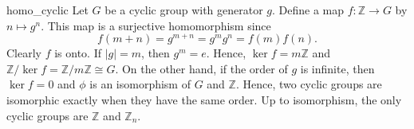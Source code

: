  
\begin{example}{homo_cyclic}
Let $G$ be a cyclic group with generator $g$. Define a map $f :
{\mathbb Z} \rightarrow G$ by $n \mapsto g^n$.  This map is a surjective
homomorphism since  
\[
f( m + n) = g^{m+n} = g^m g^n = f(m) f(n).
\]
Clearly $f$ is onto. If $|g| = m$, then  $g^m = e$. Hence, $\ker
f = m {\mathbb Z}$ and ${\mathbb Z} / \ker f =  {\mathbb Z} / m {\mathbb Z}
\cong G$. On the other hand, if the order of $g$ is infinite, then
$\ker f = 0$ and $\phi$ is an isomorphism of $G$ and ${\mathbb Z}$.
Hence, two cyclic groups are isomorphic exactly when they have the
same order. Up to isomorphism, the only cyclic groups are ${\mathbb Z}$
and ${\mathbb Z}_n$. 
\end{example}
 


